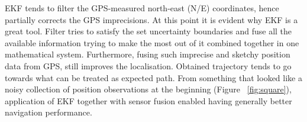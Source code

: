 EKF tends to filter the GPS-measured north-east (N/E) coordinates, hence partially corrects the GPS imprecisions. At this point it is evident why EKF is a great tool. Filter tries to satisfy the set uncertainty boundaries and fuse all the available information trying to make the most out of it combined together in one mathematical system. Furthermore, fusing such imprecise and sketchy position data from GPS, still improves the localisation. Obtained trajectory tends to go towards what can be treated as expected path. From something that looked like a noisy collection of position observations at the beginning (Figure ~\ref{fig:square}), application of EKF together with sensor fusion enabled having generally better navigation performance.